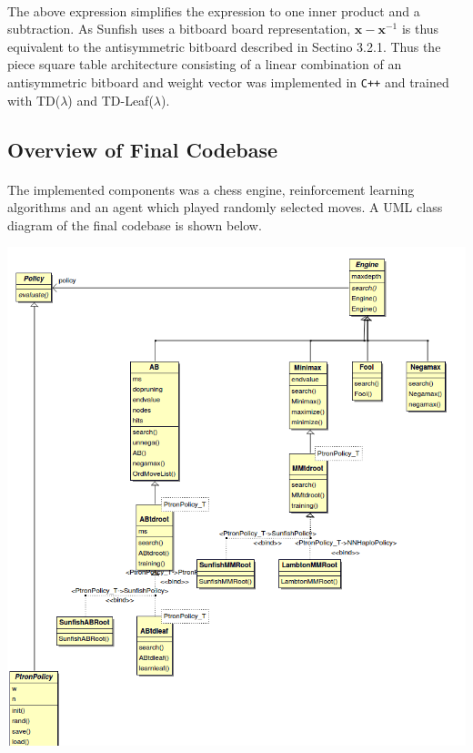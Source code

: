 \documentclass[12pt,a4paper]{book}
\begin{document}
\paragraph{} The above expression simplifies the expression to one inner product and a subtraction. As Sunfish uses a bitboard board representation, $\textbf{x} - \textbf{x}^{-1}$ is thus equivalent to the antisymmetric bitboard described in Sectino 3.2.1. Thus the piece square table architecture consisting of a linear combination of an antisymmetric bitboard and weight vector was implemented in \texttt{C++} and trained with TD($\lambda$) and TD-Leaf($\lambda$).

\subsection{Overview of Final Codebase}

\paragraph{} The implemented components was a chess engine, reinforcement learning algorithms and an agent which played randomly selected moves. A UML class diagram of the final codebase is shown below.

\begin{center}
  \includegraphics[scale=0.4]{umlClass.png}
\end{center}
\end{document}
